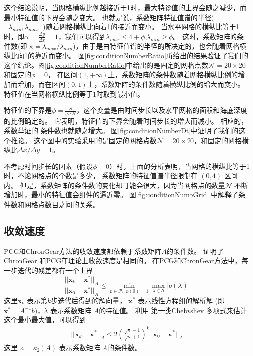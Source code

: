 这个结论说明，当网格横纵比例越接近于1时，最大特诊值的上界会随之减少，而最小特征值的下界会随之变大。
也就是说，系数矩阵特征值谱的半径($[\lambda_{min}, \lambda_{max}]$)随着网格横纵比向着1的接近而变小。 
当水平网格的横纵比等于1时，即$ \alpha = \frac{ \Delta y}{ \Delta x} = 1$，我们可以得到$\lambda_{max} \le  4 +\phi$,$\lambda_{min} \ge   \phi$。
这时，系数矩阵的条件数(即 $\kappa=  \lambda_{max}/\lambda_{min}$)，由于是由特征值谱的半径的所决定的，也会随着网格横纵比向1的靠近而变小。 
图\ref{fig:conditionNumberRatio}所给出的结果验证了我们的这个结论。图\ref{fig:conditionNumberRatio}中给出的是固定的网格点数$\mathcal{N} = 20\times 20$和固定的$\phi = 0$， 在区间$(1, +\infty)$上，系数矩阵的条件数随着网格横纵比例的增加而增加，而在区间$(0,1)$上，系数矩阵的条件数随着横纵比例的增大而变小。
特征值在当网格横纵比例等于1时取到最小值。
 
特征值的下界是$\phi=\frac{S }{g \tau^2 H}$，这个变量是由时间步长以及水平网格的面积和海底深度的比例确定的。
它表明，特征值的下界会随着时间步长的增大而减小。 
相应的，系数举证的 条件数也就随之增大。
图\ref{fig:conditionNumberDt}中证明了我们的这个推论。
这个图中的实验采用的是固定的网格点数$\mathcal{N} = 20\times 20$，和固定的网格横纵比$\Delta x /{\Delta y} = 1$。 


 
不考虑时间步长的因素（假设$\phi=0$）时，上面的分析表明，当网格的横纵比等于1时，不论网格点的个数是多少， 系数矩阵的特征值谱半径限制在 $(0,4)$ 区间内。
但是，系数矩阵的条件数的变化却可能会很大，因为当网格点的数量$\mathcal{N}$ 不断增加时，最小的特征值会组件的逼近零。 
图\ref{fig:conditionNumbGrid} 中解释了条件数和网格点数目之间的关系。 

\subsection{收敛速度} \label{convergence_rate}

 PCG和ChronGear方法的收敛速度都依赖于系数矩阵$A$的条件数。  
证明了 ChronGear  和PCG在理论上收敛速度是相同的。 
在PCG和ChronGear方法中，每一步迭代的残差都有一个上界\citep{Liesen2004}
\begin{equation}
\frac{||\textbf{x}_k-\textbf{x}^*||_A }{||\textbf{x}_0-\textbf{x}^*||_A}  \le \min_{p\in \mathcal{P}_k, p(0) = 1 }\max_{\lambda \in \mathcal{S}} |p(\lambda)| \label{PcgConvergeRate}
\end{equation}
这里$\textbf{x}_k$ 表示第$k$步迭代后得到的解向量， $\textbf{x}^*$ 表示线性方程组的解析解  (即$\textbf{x}^* = A^{-1}b$)，$\lambda$ 表示系数矩阵 $A$的特征值。
利用 第一类Chebyshev 多项式来估计这个最小最大值，可以得到 
\begin{align}
\label{chrongear_convergence}
||\textbf{x}_k-\textbf{x}^*||_A \le  2 (\frac{\sqrt{\kappa}-1}{\sqrt{\kappa}+1})^k ||\textbf{x}_0-\textbf{x}^*||_A
\end{align}
这里  $\kappa =  \kappa_2(A)$ 表示系数矩阵 $A$的条件数。


